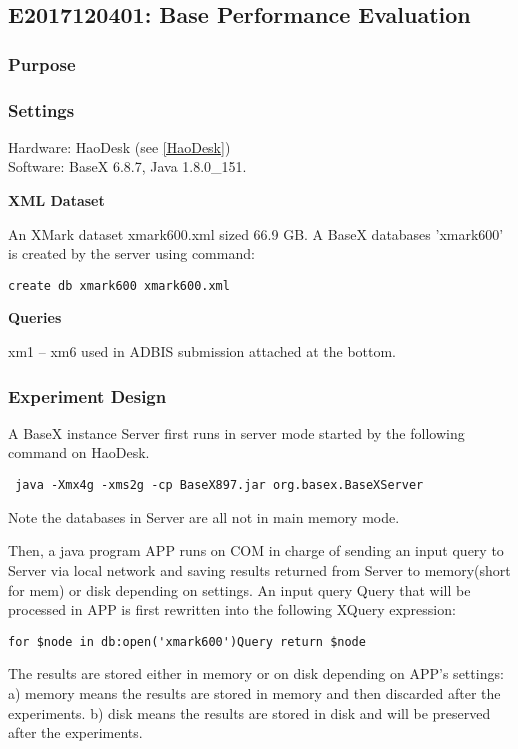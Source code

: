 \subsection{E2017120401: Base Performance Evaluation}
 
\subsubsection{Purpose}
 
\subsubsection{Settings} 
Hardware: HaoDesk (see \ref{HaoDesk})\\
Software: BaseX 6.8.7, Java 1.8.0\_151.

\textbf{XML Dataset}

An XMark dataset xmark600.xml sized 66.9 GB. A BaseX databases 'xmark600' is
created by the server using command:

\verb|create db xmark600 xmark600.xml|

\textbf{Queries} 

xm1 -- xm6 used in ADBIS submission attached at the bottom.

\subsubsection{Experiment Design}  

A BaseX instance Server first runs in server mode started by the following
command on HaoDesk.

\verb| java -Xmx4g -xms2g -cp BaseX897.jar org.basex.BaseXServer|

Note the databases in Server are all not in main memory mode.

Then, a java program APP runs on COM in charge of sending an input query to
Server via local network and saving results returned from Server to memory(short
for mem) or disk depending on settings. An input query Query that will be
processed in APP is first rewritten into the following XQuery expression:

\verb|for $node in db:open('xmark600')Query return $node|

The results are stored either in memory or on disk depending on APP's settings:
a) memory means the results are stored in memory and then discarded after the
experiments. b) disk means the results are stored in disk and will be preserved
after the experiments.


